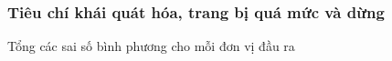 \subsubsection{Tiêu chí khái quát hóa, trang bị quá mức và dừng}

Tổng các sai số bình phương cho mỗi đơn vị đầu ra


